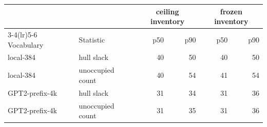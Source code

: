 \begin{tabular}{@{}llrrrr@{}}
\toprule
 & & \multicolumn{2}{c}{ceiling inventory} & \multicolumn{2}{c}{frozen inventory} \\
\cmidrule(lr){3-4}\cmidrule(lr){5-6}
Vocabulary & Statistic & p50 & p90 & p50 & p90 \\
\midrule
local-384 & hull slack & 40 & 50 & 40 & 50 \\
local-384 & unoccupied count & 40 & 54 & 41 & 54 \\
GPT2-prefix-4k & hull slack & 31 & 34 & 31 & 36 \\
GPT2-prefix-4k & unoccupied count & 31 & 35 & 31 & 36 \\
\bottomrule
\end{tabular}
